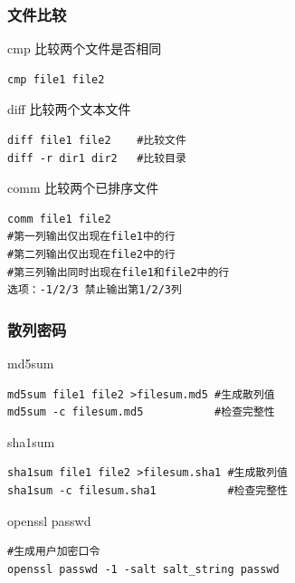 \documentclass[xcolor=svgnames,presentation]{beamer}
\begin{document}
\begin{frame}[fragile]
\frametitle{文件比较}
\label{sec-3-1-10}
\begin{exampleblock}{cmp 比较两个文件是否相同}
\label{sec-3-1-10-1}


\begin{verbatim}
cmp file1 file2
\end{verbatim}
\end{exampleblock}
\begin{block}{diff 比较两个文本文件}
\label{sec-3-1-10-2}


\begin{verbatim}
diff file1 file2    #比较文件
diff -r dir1 dir2   #比较目录
\end{verbatim}
\end{block}
\begin{exampleblock}{comm 比较两个已排序文件}
\label{sec-3-1-10-3}


\begin{verbatim}
comm file1 file2
#第一列输出仅出现在file1中的行
#第二列输出仅出现在file2中的行
#第三列输出同时出现在file1和file2中的行
选项：-1/2/3 禁止输出第1/2/3列
\end{verbatim}
\end{exampleblock}
\end{frame}
\begin{frame}[fragile]
\frametitle{散列密码}
\label{sec-3-1-11}
\begin{exampleblock}{md5sum}
\label{sec-3-1-11-1}


\begin{verbatim}
md5sum file1 file2 >filesum.md5 #生成散列值
md5sum -c filesum.md5           #检查完整性
\end{verbatim}
\end{exampleblock}
\begin{block}{sha1sum}
\label{sec-3-1-11-2}


\begin{verbatim}
sha1sum file1 file2 >filesum.sha1 #生成散列值
sha1sum -c filesum.sha1           #检查完整性
\end{verbatim}
\end{block}
\begin{exampleblock}{openssl passwd}
\label{sec-3-1-11-3}


\begin{verbatim}
#生成用户加密口令
openssl passwd -1 -salt salt_string passwd
\end{verbatim}
\end{exampleblock}
\end{frame}
\end{document}
